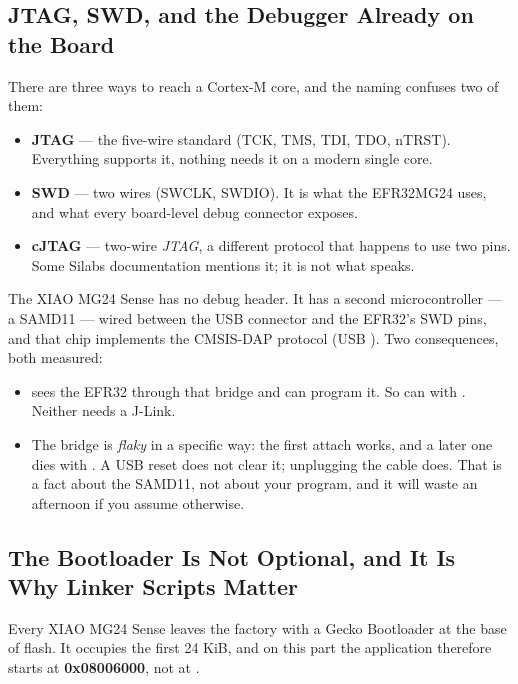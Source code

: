 \subsection{JTAG, SWD, and the Debugger Already on the Board}

There are three ways to reach a Cortex-M core, and the naming confuses two of them:

\begin{itemize}
    \item \textbf{JTAG} — the five-wire standard (TCK, TMS, TDI, TDO, nTRST). Everything supports it,
          nothing needs it on a modern single core.
    \item \textbf{SWD} — two wires (SWCLK, SWDIO). It is what the EFR32MG24 uses, and what every
          board-level debug connector exposes.
    \item \textbf{cJTAG} — two-wire \emph{JTAG}, a different protocol that happens to use two pins.
          Some Silabs documentation mentions it; it is not what  speaks.
\end{itemize}

The XIAO MG24 Sense has no debug header. It has a second microcontroller — a SAMD11 — wired between
the USB connector and the EFR32's SWD pins, and that chip implements the CMSIS-DAP protocol
(USB ). Two consequences, both measured:

\begin{itemize}
    \item {} sees the EFR32 through that bridge and can program it. So can
           with . Neither needs a J-Link.
    \item The bridge is \emph{flaky} in a specific way: the first attach works, and a later one dies
          with . A USB reset
          does not clear it; unplugging the cable does. That is a fact about the SAMD11, not about
          your program, and it will waste an afternoon if you assume otherwise.
\end{itemize}

\subsection{The Bootloader Is Not Optional, and It Is Why Linker Scripts Matter}

Every XIAO MG24 Sense leaves the factory with a Gecko Bootloader at the base of flash. It occupies
the first 24 KiB, and on this part the application therefore starts at \textbf{0x08006000}, not at
.

